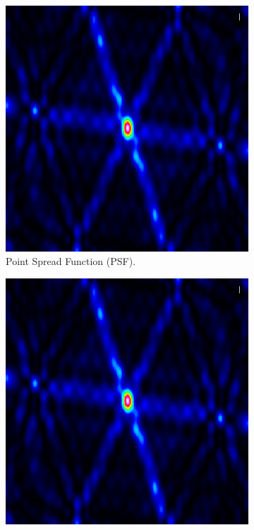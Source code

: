 \begin{figure}[h!]
	\centering
	\begin{subfigure}[b]{0.3\linewidth}
		\includegraphics[width=\linewidth]{./chapters/01.intro/img/PSF.png}
		\caption{Point Spread Function (PSF).}
	\end{subfigure}
	\begin{subfigure}[b]{0.3\linewidth}
		\includegraphics[width=\linewidth]{./chapters/01.intro/img/PSF.png}

\end{subfigure}
\end{figure}
